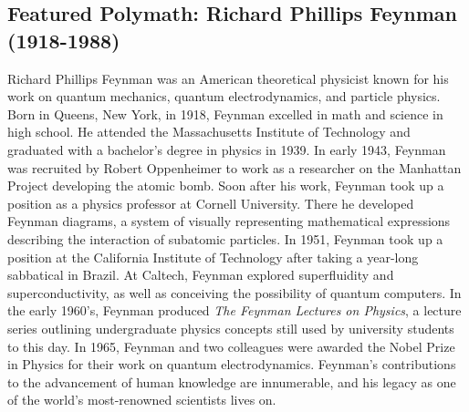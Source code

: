 \documentclass[12pt]{article}
\theoremstyle{definition}
\begin{document}
\subsection*{Featured Polymath: Richard Phillips Feynman (1918-1988)}
Richard Phillips Feynman was an American theoretical physicist known for his work on quantum mechanics, quantum electrodynamics, and particle physics. Born in Queens, New York, in 1918, Feynman excelled in math and science in high school. He attended the Massachusetts Institute of Technology and graduated with a bachelor’s degree in physics in 1939. In early 1943, Feynman was recruited by Robert Oppenheimer to work as a researcher on the Manhattan Project developing the atomic bomb. Soon after his work, Feynman took up a position as a physics professor at Cornell University. There he developed Feynman diagrams, a system of visually representing mathematical expressions describing the interaction of subatomic particles. In 1951, Feynman took up a position at the California Institute of Technology after taking a year-long sabbatical in Brazil. At Caltech, Feynman explored superfluidity and superconductivity, as well as conceiving the possibility of quantum computers. In the early 1960’s, Feynman produced \textit{The Feynman Lectures on Physics}, a lecture series outlining undergraduate physics concepts still used by university students to this day. In 1965, Feynman and two colleagues were awarded the Nobel Prize in Physics for their work on quantum electrodynamics. Feynman’s contributions to the advancement of human knowledge are innumerable, and his legacy as one of the world’s most-renowned scientists lives on. 
\newpage


\def\currentTitleWallpaper{2020_Pure_Math_Title_Page_Border.pdf}



\newpage



\newpage



\newpage



\newpage

\def\currentTitleWallpaper{2020_Philosophy_Title_Page_Border.pdf}
\end{document}
